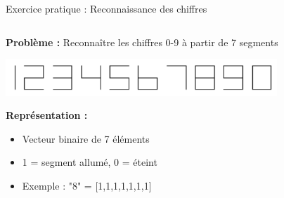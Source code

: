 \documentclass{beamer}
\begin{document}
	\begin{frame}{Exercice pratique : Reconnaissance des chiffres}
		\begin{columns}
			\begin{column}{0.6\textwidth}
				\textbf{Problème :} Reconnaître les chiffres 0-9 à partir de 7 segments
				
				\begin{center}
					\includegraphics[width=0.8\textwidth]{assets/digits.png}
				\end{center}
				
				\textbf{Représentation :}
				\begin{itemize}
					\item Vecteur binaire de 7 éléments
					\item 1 = segment allumé, 0 = éteint
					\item Exemple : "8" = [1,1,1,1,1,1,1]
				\end{itemize}
			\end{column}
			\begin{column}{0.4\textwidth}

\end{column}
\end{columns}
\end{frame}
\end{document}
